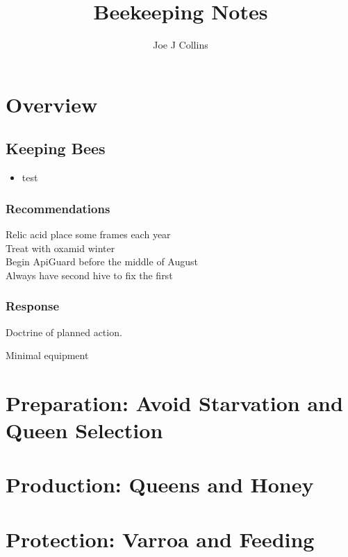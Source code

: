 \documentclass{./BeekeepingBook}
\title{Beekeeping Notes}
\author{Joe J Collins}
\date{\DTMnow}
\begin{document}
 
\maketitle
\tableofcontents

\chapter{Overview}

\section*{Keeping Bees}

\begin{itemize}
  \item test
\end{itemize}
 
\subsection*{Recommendations}

\begin{description}
  \item[Relic acid place some frames each year]
  \item[Treat with oxamid winter]
  \item[Begin ApiGuard before the middle of August]
  \item[Always have second hive to fix the first]
\end{description}

\subsection*{Response}

Doctrine of planned action.

Minimal equipment

\chapter{Preparation: Avoid Starvation and Queen Selection}



\chapter{Production: Queens and Honey}



 
\chapter{Protection: Varroa and Feeding}



\end{document}
